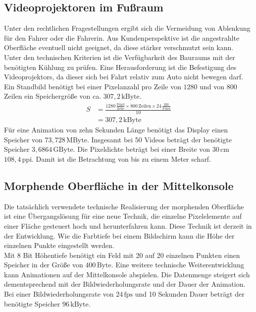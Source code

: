 \subsection{Videoprojektoren im Fußraum}
Unter den rechtlichen Fragestellungen ergibt sich die Vermeidung von Ablenkung für den Fahrer oder die Fahrerin.
Aus Kundenperspektive ist die angestrahlte Oberfläche eventuell nicht geeignet, da diese stärker verschmutzt sein kann. \\
Unter den technischen Kriterien ist die Verfügbarkeit des Bauraums mit der benötigten Kühlung zu prüfen. Eine Herausforderung ist die Befestigung des Videoprojektors, da dieser sich bei Fahrt relativ zum Auto nicht bewegen darf. 
Ein Standbild benötigt bei einer Pixelanzahl pro Zeile von $ 1280 $ und von $ 800 $ Zeilen ein Speichergröße von ca. $ 307,2\,\mathrm{kByte}$. 
\begin{align}
	S &= \frac{1280\,\frac{\mathrm{Pixel}}{\mathrm{Zeile}}\times 800\,\mathrm{Zeilen} \times 24\,\frac{\mathrm{Bit}}{\mathrm{Pixel}}}{10} \\
	&= 307,2\,\mathrm{kByte}
\end{align}
Für eine Animation von zehn Sekunden Länge benötigt das Display einen Speicher von $ 73,728\,\mathrm{MByte}$.
Insgesamt bei 50 Videos beträgt der benötigte Speicher $ 3,6864\,\mathrm{GByte}$.
Die Pixeldichte beträgt bei einer Breite von $ 30\,\mathrm{cm} $ $ 108,4\,\mathrm{ppi} $. Damit ist die Betrachtung von bis zu einem Meter scharf.
\subsection{Morphende Oberfläche in der Mittelkonsole}
Die tatsächlich verwendete technische Realisierung der morphenden Oberfläche ist eine Übergangslösung für eine neue Technik, die einzelne Pixelelemente auf einer Fläche gesteuert hoch und herunterfahren kann. Diese Technik ist derzeit in der Entwicklung. Wie die Farbtiefe bei einem Bildschirm kann die Höhe der einzelnen Punkte eingestellt werden. \\
Mit 8 Bit Höhentiefe benötigt ein Feld mit 20 auf 20 einzelnen Punkten einen Speicher in der Größe von $ 400\,\mathrm{Byte}$.
Eine weitere technische Weiterentwicklung kann Animationen auf der Mittelkonsole abspielen. Die Datenmenge steigert sich dementsprechend mit der Bildwiederholungsrate und der Dauer der Animation. Bei einer Bildwiederholungsrate von $ 24\,\mathrm{fps} $ und 10 Sekunden Dauer beträgt der benötigte Speicher $ 96\,\mathrm{kByte}$.
